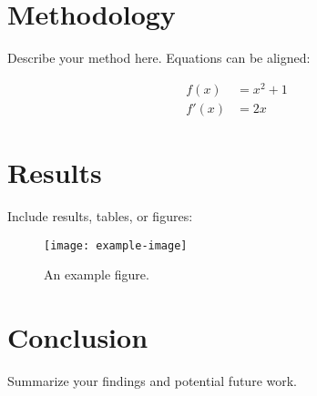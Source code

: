 \documentclass[12pt]{article}
\begin{document}
\section{Methodology}

Describe your method here. Equations can be aligned:

\begin{align}
f(x) &= x^2 + 1 \\
f'(x) &= 2x
\end{align}

\section{Results}

Include results, tables, or figures:

\begin{figure}[h]
\centering
\texttt{[image: example-image]}
\caption{An example figure.}
\label{fig:example}
\end{figure}

\section{Conclusion}

Summarize your findings and potential future work.

\printbibliography
\end{document}
